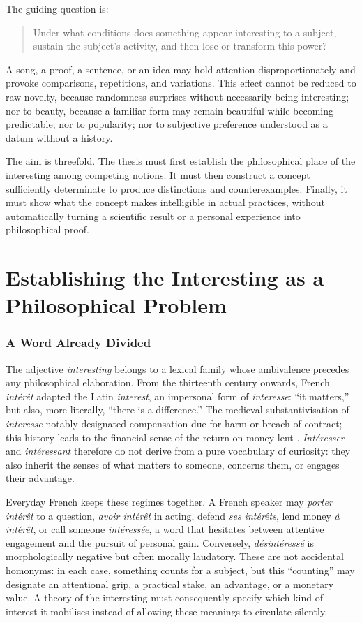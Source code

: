\documentclass[11pt,a4paper]{article}
\begin{document}
The guiding question is:

\begin{quote}
Under what conditions does something appear interesting to a subject, sustain
the subject's activity, and then lose or transform this power?
\end{quote}

A song, a proof, a sentence, or an idea may hold attention disproportionately
and provoke comparisons, repetitions, and variations. This effect cannot be
reduced to raw novelty, because randomness surprises without necessarily being
interesting; nor to beauty, because a familiar form may remain beautiful while
becoming predictable; nor to popularity; nor to subjective preference
understood as a datum without a history.

The aim is threefold. The thesis must first establish the philosophical place of
the interesting among competing notions. It must then construct a concept
sufficiently determinate to produce distinctions and counterexamples. Finally,
it must show what the concept makes intelligible in actual practices, without
automatically turning a scientific result or a personal experience into
philosophical proof.

\part{Establishing the Interesting as a Philosophical Problem}

\section{A Word Already Divided}

The adjective \emph{interesting} belongs to a lexical family whose ambivalence
precedes any philosophical elaboration. From the thirteenth century onwards,
French \emph{intérêt} adapted the Latin \emph{interest}, an impersonal form of
\emph{interesse}: ``it matters,'' but also, more literally, ``there is a
difference.'' The medieval substantivisation of \emph{interesse} notably
designated compensation due for harm or breach of contract; this history leads
to the financial sense of the return on money lent
\parencite{academie2026interet,cnrtl2026interet}. \emph{Intéresser} and
\emph{intéressant} therefore do not derive from a pure vocabulary of curiosity:
they also inherit the senses of what matters to someone, concerns them, or
engages their advantage.

Everyday French keeps these regimes together. A French speaker may \emph{porter
intérêt} to a question, \emph{avoir intérêt} in acting, defend \emph{ses
intérêts}, lend money \emph{à intérêt}, or call someone \emph{intéressée}, a
word that hesitates between attentive engagement and the pursuit of personal gain.
Conversely, \emph{désintéressé} is morphologically negative but often morally
laudatory. These are not accidental homonyms: in each case, something counts
for a subject, but this ``counting'' may designate an attentional grip, a
practical stake, an advantage, or a monetary value. A theory of the interesting
must consequently specify which kind of interest it mobilises instead of
allowing these meanings to circulate silently.
\end{document}
